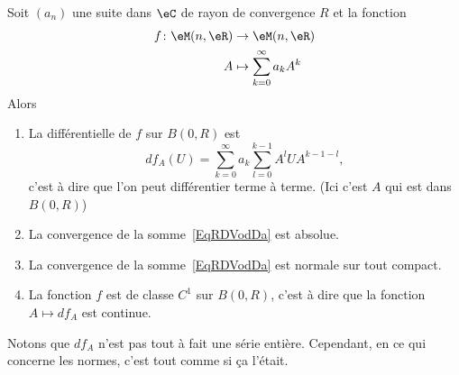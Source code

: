 \begin{proposition} \label{PropAMBXKgV}
    Soit \( (a_n)\) une suite dans \( \eC\) de rayon de convergence \( R\) et la fonction
    \begin{equation}
        \begin{aligned}
            f\colon \eM(n,\eR)&\to \eM(n,\eR) \\
            A&\mapsto \sum_{k=0}^{\infty}a_kA^k
        \end{aligned}
    \end{equation}
    Alors
    \begin{enumerate}
        \item
            La différentielle de \( f\) sur \( B(0,R)\) est
            \begin{equation}    \label{EqRDVodDa}
                df_A(U)=\sum_{k=0}^{\infty}a_k\sum_{l=0}^{k-1}A^lUA^{k-1-l},
            \end{equation}
            c'est à dire que l'on peut différentier terme à terme. (Ici c'est \( A\) qui est dans \( B(0,R)\))
        \item
            La convergence de la somme~\ref{EqRDVodDa} est absolue.
        \item
            La convergence de la somme~\ref{EqRDVodDa} est normale sur tout compact.
        \item
            La fonction \( f\) est de classe \( C^1\) sur \( B(0,R)\), c'est à dire que la fonction \( A\mapsto df_A\) est continue.
    \end{enumerate}
\end{proposition}
Notons que \( df_A\) n'est pas tout à fait une série entière. Cependant, en ce qui concerne les normes, c'est tout comme si ça l'était.

